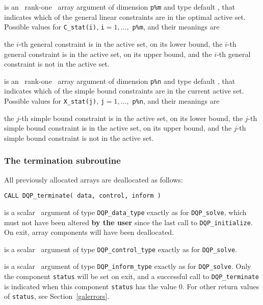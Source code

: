 \documentclass{galahad}
\newcommand{\packagename}{DQP}
\begin{document}
\begin{description}
 is an \optional\ rank-one \intentout\ array argument of
dimension {\tt p\%m}
and type default \integer, that indicates which of the general linear
constraints are in the optimal active set. Possible values for
{\tt C\_stat(i)}, {\tt i}$=1, \ldots ,$ {\tt p\%m}, and their meanings are
\begin{description}
 the $i$-th general constraint
is in the active set, on its lower bound,
 the $i$-th general constraint
is in the active set, on its upper bound, and
  the $i$-th general constraint is not in the active set.
\end{description}

 is an \optional\ rank-one \intentout\ array argument of
dimension {\tt p\%n}
and type default \integer, that indicates which of the simple bound
constraints are in the current active set. Possible values for
{\tt X\_stat(j)}, {\tt j}$=1, \ldots ,$ {\tt p\%n}, and their meanings are
\begin{description}
 the $j$-th simple bound constraint
is in the active set, on its lower bound,
 the $j$-th simple bound constraint
is in the active set, on its upper bound, and
  the $j$-th simple bound constraint is not in the active set.
\end{description}

\end{description}


\subsubsection{The  termination subroutine}
All previously allocated arrays are deallocated as follows:
\vspace*{1mm}

\hspace{8mm}
{\tt CALL \packagename\_terminate( data, control, inform )}

\vspace*{-3mm}
\begin{description}

 is a scalar \intentinout\ argument of type
{\tt \packagename\_data\_type}
exactly as for
{\tt \packagename\_solve},
which must not have been altered {\bf by the user} since the last call to
{\tt \packagename\_initialize}.
On exit, array components will have been deallocated.

 is a scalar \intentin\ argument of type
{\tt \packagename\_control\_type}
exactly as for
{\tt \packagename\_solve}.

 is a scalar \intentout\ argument of type
{\tt \packagename\_inform\_type}
exactly as for
{\tt \packagename\_solve}.
Only the component {\tt status} will be set on exit, and a
successful call to
{\tt \packagename\_terminate}
is indicated when this  component {\tt status} has the value 0.
For other return values of {\tt status}, see Section~\ref{galerrors}.

\end{description}
\end{document}

